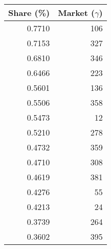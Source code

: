 \begin{tabular}{rr}
\toprule
 Share (\%) &  Market ($\gamma$) \\
\midrule
     0.7710 &                106 \\
     0.7153 &                327 \\
     0.6810 &                346 \\
     0.6466 &                223 \\
     0.5601 &                136 \\
     0.5506 &                358 \\
     0.5473 &                 12 \\
     0.5210 &                278 \\
     0.4732 &                359 \\
     0.4710 &                308 \\
     0.4619 &                381 \\
     0.4276 &                 55 \\
     0.4213 &                 24 \\
     0.3739 &                264 \\
     0.3602 &                395 \\
\bottomrule
\end{tabular}
